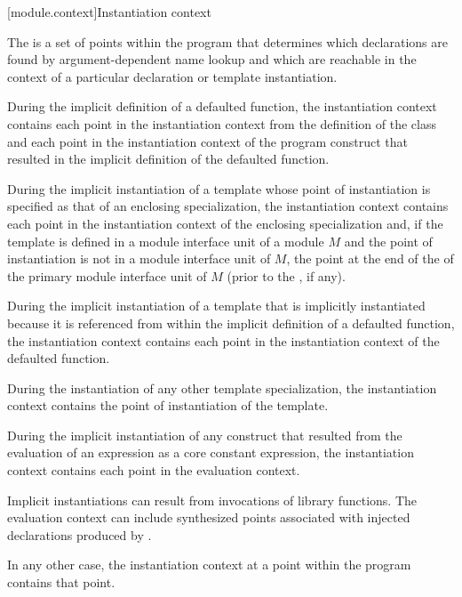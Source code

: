 [module.context]{Instantiation context}

\pnum
The  is a set of points within the program
that determines which declarations are found by
argument-dependent name lookup
and which are reachable
in the context of a particular declaration or template instantiation.

\pnum
During the implicit definition of
a defaulted function,
the instantiation context contains each point in
the instantiation context from the definition of the class and
each point in
the instantiation context of the program construct that
resulted in the implicit definition of the defaulted function.

\pnum
During the implicit instantiation of a template
whose point of instantiation is specified as
that of an enclosing specialization,
the instantiation context contains each point in
the instantiation context of the enclosing specialization and,
if the template is defined in a module interface unit of a module $M$
and the point of instantiation is not in a module interface unit of $M$,
the point at the end of the
 of the
primary module interface unit of $M$
(prior to the , if any).

\pnum
During the implicit instantiation of a template
that is implicitly instantiated because it is referenced
from within the implicit definition of a defaulted function,
the instantiation context contains each point in the instantiation context of
the defaulted function.

\pnum
During the instantiation of any other template specialization,
the instantiation context contains the point of instantiation
of the template.

\pnum
During the implicit instantiation of any construct
that resulted from the evaluation of an expression
as a core constant expression,
the instantiation context contains
each point in the evaluation context.
\begin{note}
Implicit instantiations can result
from invocations of library functions.
The evaluation context can include synthesized points
associated with injected declarations
produced by .
\end{note}

\pnum
In any other case, the instantiation context
at a point within the program
contains that point.

